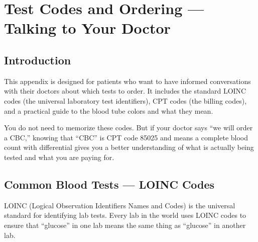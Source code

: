 \chapter{Test Codes and Ordering --- Talking to Your Doctor}
\label{app:test_codes}

\clearpage
\section{Introduction}

This appendix is designed for patients who want to have informed conversations with their doctors about which tests to order. It includes the standard LOINC codes (the universal laboratory test identifiers), CPT codes (the billing codes), and a practical guide to the blood tube colors and what they mean.

You do not need to memorize these codes. But if your doctor says ``we will order a CBC,'' knowing that ``CBC'' is CPT code 85025 and means a complete blood count with differential gives you a better understanding of what is actually being tested and what you are paying for.

\clearpage
\section{Common Blood Tests --- LOINC Codes}

LOINC (Logical Observation Identifiers Names and Codes) is the universal standard for identifying lab tests. Every lab in the world uses LOINC codes to ensure that ``glucose'' in one lab means the same thing as ``glucose'' in another lab.

